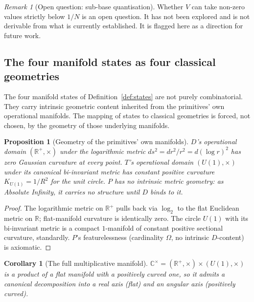 \documentclass[11pt,a4paper]{article}
\newtheorem{corollary}[theorem]{Corollary}
\newtheorem{proposition}[theorem]{Proposition}
\theoremstyle{definition}
\theoremstyle{remark}
\newtheorem{remark}[theorem]{Remark}
\newcommand{\R}{\mathbb{R}}
\newcommand{\C}{\mathbb{C}}
\begin{document}
\begin{remark}[Open question: sub-base quantisation]\label{rem:subbase-open}
Whether $V$ can take non-zero values strictly below $1/N$ is an open question. It has not been explored and is not derivable from what is currently established. It is flagged here as a direction for future work.
\end{remark}

\subsection{The four manifold states as four classical geometries}\label{subsec:geometries}

The four manifold states of Definition~\ref{def:states} are not purely combinatorial. They carry intrinsic geometric content inherited from the primitives' own operational manifolds. The mapping of states to classical geometries is forced, not chosen, by the geometry of those underlying manifolds.

\begin{proposition}[Geometry of the primitives' own manifolds]\label{prop:primitive-geometries}
$D$'s operational domain $(\R^{+},\times)$ under the logarithmic metric $ds^{2} = dr^{2}/r^{2} = d(\log r)^{2}$ has zero Gaussian curvature at every point. $T$'s operational domain $(U(1),\times)$ under its canonical bi-invariant metric has constant positive curvature $K_{U(1)} = 1/R^{2}$ for the unit circle. $P$ has no intrinsic metric geometry: as Absolute Infinity, it carries no structure until $D$ binds to it.
\end{proposition}

\begin{proof}
The logarithmic metric on $\R^{+}$ pulls back via $\log_{2}$ to the flat Euclidean metric on $\R$; flat-manifold curvature is identically zero. The circle $U(1)$ with its bi-invariant metric is a compact $1$-manifold of constant positive sectional curvature, standardly. $P$'s featurelessness (cardinality $\Omega$, no intrinsic $D$-content) is axiomatic.
\end{proof}

\begin{corollary}[The full multiplicative manifold]\label{cor:CMinus0}
$\C^{\times} = (\R^{+},\times)\times(U(1),\times)$ is a product of a flat manifold with a positively curved one, so it admits a canonical decomposition into a real axis (flat) and an angular axis (positively curved).
\end{corollary}
\end{document}

